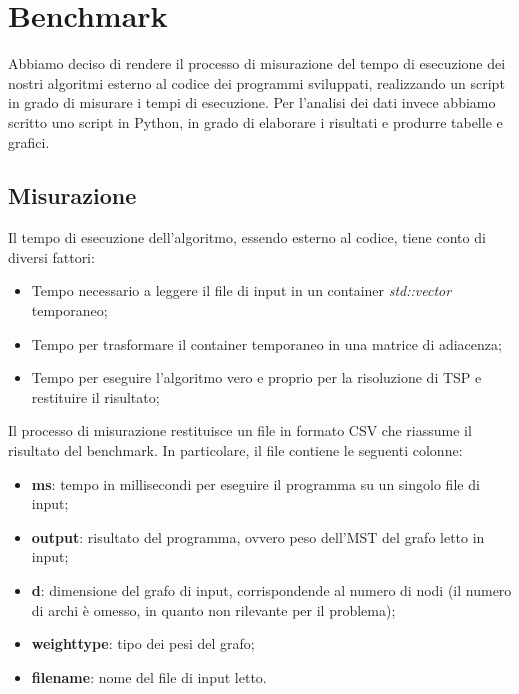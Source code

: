 \section{Benchmark}
\label{cap:benchmark-process}

Abbiamo deciso di rendere il processo di misurazione del tempo di
esecuzione dei nostri algoritmi esterno al codice dei programmi
sviluppati, realizzando un script in grado di misurare i tempi di
esecuzione. Per l'analisi dei dati invece abbiamo scritto uno script
in Python, in grado di elaborare i risultati e produrre tabelle e
grafici.

\subsection{Misurazione}

Il tempo di esecuzione dell'algoritmo, essendo esterno al codice,
tiene conto di diversi fattori:

\begin{itemize}
    \item Tempo necessario a leggere il file di input in un container
      \textit{std::vector} temporaneo;
    \item Tempo per trasformare il container temporaneo in una matrice
      di adiacenza;
    \item Tempo per eseguire l'algoritmo vero e proprio per la
      risoluzione di TSP e restituire il risultato;
\end{itemize}

\noindent Il processo di misurazione restituisce un file in formato
CSV che riassume il risultato del benchmark. In particolare, il file
contiene le seguenti colonne:

\begin{itemize}
    \item \textbf{ms}: tempo in millisecondi per eseguire il programma
      su un singolo file di input;
    \item \textbf{output}: risultato del programma, ovvero peso
      dell'MST del grafo letto in input;
    \item \textbf{d}: dimensione del grafo di input, corrispondende al
      numero di nodi (il numero di archi è omesso, in quanto non
      rilevante per il problema);
    \item \textbf{weight\textunderscore type}: tipo dei pesi del
      grafo;
    \item \textbf{filename}: nome del file di input letto.
\end{itemize}

